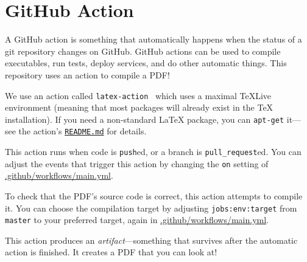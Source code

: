\section{GitHub Action}

A GitHub action is something that automatically happens when the status of a git repository changes on GitHub.
GitHub actions can be used to compile executables, run tests, deploy services, and do other automatic things.
This repository uses an action to compile a PDF!

We use an action called \texttt{latex-action}~\cite{latex-action} which uses a maximal TeXLive environment (meaning that most packages will already exist in the TeX installation).
If you need a non-standard LaTeX package, you can \texttt{apt-get} it---see the action's \href{https://github.com/dante-ev/latex-action/blob/master/README.md}{\texttt{README.md}} for details.

This action runs when code is \texttt{push}ed, or a branch is \texttt{pull\_request}ed.  You can adjust the events that trigger this action by changing the \texttt{on} setting of \href{https://github.com/evanberkowitz/latex-base/blob/gh-action/.github/workflows/main.yml}{.github/workflows/main.yml}.

To check that the PDF's source code is correct, this action attempts to compile it.  You can choose the compilation target by adjusting \texttt{jobs:env:target} from \texttt{master} to your preferred target, again in \href{https://github.com/evanberkowitz/latex-base/blob/gh-action/.github/workflows/main.yml}{.github/workflows/main.yml}.

This action produces an \emph{artifact}---something that survives after the automatic action is finished.
It creates a PDF that you can look at!

